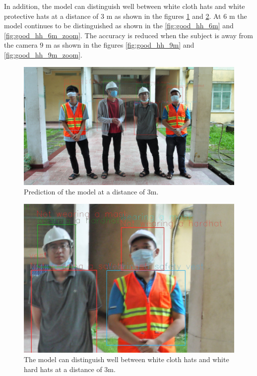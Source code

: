 \documentclass[conference]{IEEEtran}
\begin{document}
In addition, the model can distinguish well between white cloth hats and white protective hats at a distance of $ 3 $ m as shown in the figures \ref{fig:good_hh} and \ref{fig:good_hh_zoom}. At $ 6 $ m the model continues to be distinguished as shown in the \ref{fig:good_hh_6m} and \ref{fig:good_hh_6m_zoom}. The accuracy is reduced when the subject is away from the camera $ 9 $ m as shown in the figures \ref{fig:good_hh_9m} and \ref {fig:good_hh_9m_zoom}.
\begin{figure}[ht]
	\centerline{\includegraphics[scale=0.08]{images/good_hh.jpg}}
  	\caption{Prediction of the model at a distance of 3m.}
  	\label{fig:good_hh}
\end{figure}
\begin{figure}[ht]
	\centerline{\includegraphics[scale=0.2]{images/good_hh_zoom.jpg}}
  	\caption{The model can distinguish well between white cloth hats and white hard hats at a distance of 3m.}
  	\label{fig:good_hh_zoom}
\end{figure}
\end{document}
